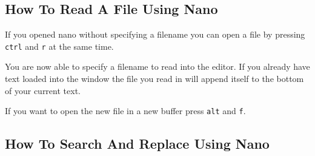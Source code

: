 \subsection{How To Read A File Using Nano}
If you opened nano without specifying a filename you can open a file by pressing \texttt{ctrl}  and
\texttt{r} at the same time.

You are now able to specify a filename to read into the editor. If you already have text loaded into
the window the file you read in will append itself to the bottom of your current text.

If you want to open the new file in a new buffer press \texttt{alt} and \texttt{f}.

\subsection{How To Search And Replace Using Nano}

